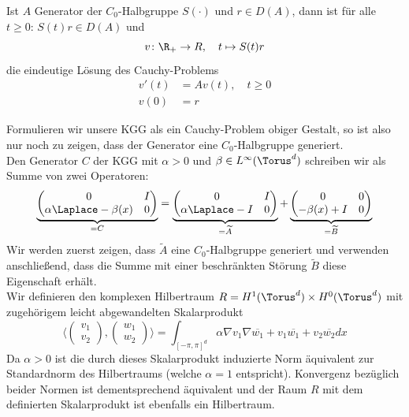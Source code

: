 \begin{maththeorem}
Ist $A$ Generator der $C_0$-Halbgruppe $S(\cdot)$ und $r\in D(A)$, dann ist für alle $t\ge 0\colon \,S(t)r\in D(A)$ und
\[v\colon \R_+\to R,\quad t\mapsto S(t)r\]
die eindeutige Lösung des Cauchy-Problems
\begin{equation}
\begin{split}
v'(t)&=Av(t),\quad t\ge 0\\
v(0)&=r
\end{split}
\end{equation}
\end{maththeorem}
Formulieren wir unsere KGG als ein Cauchy-Problem obiger Gestalt, so ist also nur noch zu zeigen, dass der Generator eine $C_0$-Halbgruppe generiert.\\
Den Generator $C$ der KGG mit $\alpha>0$ und $\beta\in L^\infty(\Torus^d)$ schreiben wir als Summe von zwei Operatoren:
\[\underbrace{\begin{pmatrix}0 & I\\ \alpha\Laplace -\beta(x) & 0\end{pmatrix}}_{=C}
=\underbrace{\begin{pmatrix}0 & I\\ \alpha\Laplace-I & 0\end{pmatrix}}_{=\widetilde{A}}
+\underbrace{\begin{pmatrix}0 & 0\\ -\beta(x)+I & 0\end{pmatrix}}_{=\widetilde{B}}\]
Wir werden zuerst zeigen, dass $\widetilde{A}$ eine $C_0$-Halbgruppe generiert und verwenden anschließend, dass die Summe mit einer beschränkten Störung $\widetilde{B}$ diese Eigenschaft erhält.\\[0.2cm]
Wir definieren den komplexen Hilbertraum $R=H^1(\Torus^d)\times H^0(\Torus^d)$ mit zugehörigem leicht abgewandelten Skalarprodukt 
\[\langle \begin{pmatrix}v_1\\v_2\end{pmatrix}, \begin{pmatrix}w_1\\w_2\end{pmatrix}\rangle =\int_{[-\pi,\pi]^d}\alpha \nabla v_1\nabla \overline{w_1}+v_1\overline{w_1}+ v_2\overline{w_2}dx\]
Da $\alpha>0$ ist die durch dieses Skalarprodukt induzierte Norm äquivalent zur Standardnorm des Hilbertraums (welche $\alpha=1$ entspricht). Konvergenz bezüglich beider Normen ist dementsprechend äquivalent und der Raum $R$ mit dem definierten Skalarprodukt ist ebenfalls ein Hilbertraum.\\

